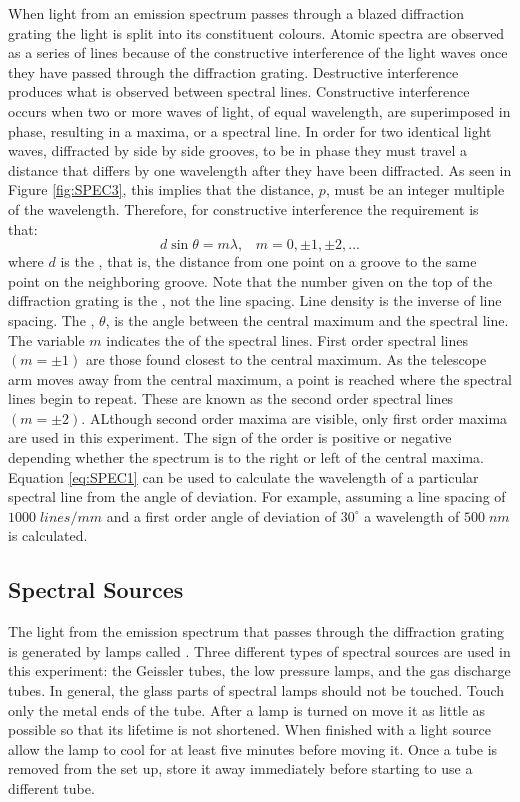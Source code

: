When light from an emission spectrum passes through a blazed diffraction grating the light is split into its constituent colours. Atomic spectra are observed as a series of lines because of the constructive interference of the light waves once they have passed through the diffraction grating. Destructive interference produces what is observed between spectral lines. Constructive interference occurs when two or more waves of light, of equal wavelength, are superimposed in phase, resulting in a maxima, or a spectral line. In order for two identical light waves, diffracted by side by side grooves, to be in phase they must travel a distance that differs by one wavelength after they have been diffracted. As seen in Figure \ref{fig:SPEC3}, this implies that the distance, $p$, must be an integer multiple of the wavelength. Therefore, for constructive interference the requirement is that: \begin{equation}\label{eq:SPEC1}
    d\sin\theta = m\lambda, \;\;\;m = 0,\pm 1,\pm 2,...
\end{equation}
where $d$ is the , that is, the distance from one point on a groove to the same point on the neighboring groove. Note that the number given on the top of the diffraction grating is the , not the line spacing. Line density is the inverse of line spacing. The , $\theta$, is the angle between the central maximum and the spectral line. The variable $m$ indicates the  of the spectral lines. First order spectral lines $(m = \pm 1)$ are those found closest to the central maximum. As the telescope arm moves away from the central maximum, a point is reached where the spectral lines begin to repeat. These are known as the second order spectral lines $(m = \pm 2)$. ALthough second order maxima are visible, only first order maxima are used in this experiment. The sign of the order is positive or negative depending whether the spectrum is to the right or left of the central maxima. Equation \ref{eq:SPEC1} can be used to calculate the wavelength of a particular spectral line from the angle of deviation. For example, assuming a line spacing of $1000\;lines/mm$ and a first order angle of deviation of $30^{\circ}$ a wavelength of $500\;nm$ is calculated.

\subsection{Spectral Sources}

The light from the emission spectrum that passes through the diffraction grating is generated by lamps called . Three different types of spectral sources are used in this experiment: the Geissler tubes, the low pressure lamps, and the gas discharge tubes. In general, the glass parts of spectral lamps should not be touched. Touch only the metal ends of the tube. After a lamp is turned on move it as little as possible so that its lifetime is not shortened. When finished with a light source allow the lamp to cool for at least five minutes before moving it. Once a tube is removed from the set up, store it away immediately before starting to use a different tube.

